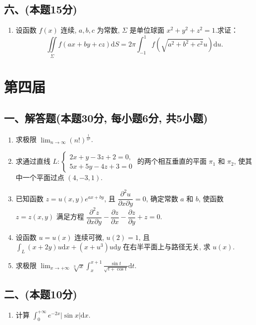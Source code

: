\subsection*{六、(本题15分)}
\begin{enumerate}[start=9]
    \item 设函数 $f(x)$ 连续,  $a,  b,  c$ 为常数,  $\Sigma$ 是单位球面 $x^2 + y^2 + z^2 = 1$.求证：
          \[
              \iint\limits_{\Sigma} f(ax + by + cz)  \mathrm{d}S = 2\pi \int_{-1}^{1} f\left(\sqrt{a^2 + b^2 + c^2} u\right)  \mathrm{d}u.
          \]
\end{enumerate}


\newpage
\section{第四届}

\subsection*{一、解答题(本题30分,  每小题6分,  共5小题)}
\begin{enumerate}
    \item 求极限 $\displaystyle\lim_{n \to \infty} (n!)^{\frac{1}{n^2}}$.
    \item 求通过直线 $L:
              \begin{cases}
                  2x + y - 3z + 2 = 0, \\
                  5x + 5y - 4z + 3 = 0
              \end{cases}$ 的两个相互垂直的平面 $\pi_1$ 和 $\pi_2$,  使其中一个平面过点 $(4,  -3,  1)$.
    \item 已知函数 $z = u(x,  y)e^{ax + by}$,  且 $\dfrac{\partial^2 u}{\partial x \partial y} = 0$,  确定常数 $a$ 和 $b$,  使函数 $z = z(x,  y)$ 满足方程
          $\dfrac{\partial^2 z}{\partial x \partial y} - \dfrac{\partial z}{\partial x} - \dfrac{\partial z}{\partial y} + z = 0.$
    \item 设函数 $u = u(x)$ 连续可微,  $u(2) = 1$,  且 $\displaystyle\int_L (x + 2y) u  \mathrm{d}x + (x + u^3) u  \mathrm{d}y$ 在右半平面上与路径无关,  求 $u(x)$.
    \item 求极限 $\displaystyle\lim_{x \to +\infty} \sqrt[3]{x} \int_x^{x+1} \frac{\sin t}{\sqrt{t + \cos t}}  \mathrm{d}t$.
\end{enumerate}

\subsection*{二、(本题10分)}
\begin{enumerate}[start=6]
    \item 计算 $\displaystyle\int_0^{+\infty} e^{-2x} |\sin x|  \mathrm{d}x$.
\end{enumerate}

